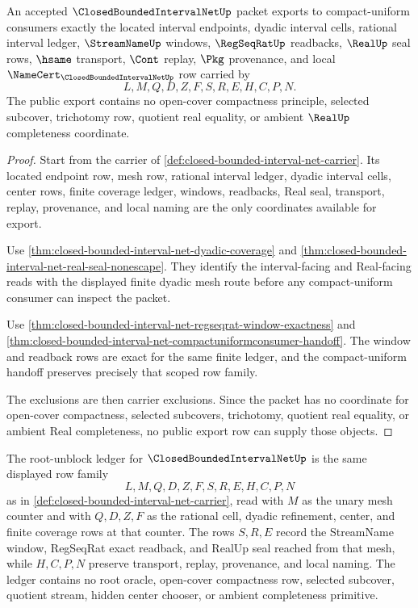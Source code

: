 \begin{theorem}
\label{thm:closed-bounded-interval-net-public-finite-net-export}
An accepted $\ClosedBoundedIntervalNetUp$ packet exports to compact-uniform consumers exactly the located interval endpoints, dyadic interval cells, rational interval ledger, $\StreamNameUp$ windows, $\RegSeqRatUp$ readbacks, $\RealUp$ seal rows, $\hsame$ transport, $\Cont$ replay, $\Pkg$ provenance, and local $\NameCert_{\ClosedBoundedIntervalNetUp}$ row carried by
$$
L,M,Q,D,Z,F,S,R,E,H,C,P,N.
$$
The public export contains no open-cover compactness principle, selected subcover, trichotomy row, quotient real equality, or ambient $\RealUp$ completeness coordinate.
\end{theorem}
\begin{proof}
Start from the carrier of \autoref{def:closed-bounded-interval-net-carrier}. Its located endpoint row, mesh row, rational interval ledger, dyadic interval cells, center rows, finite coverage ledger, windows, readbacks, Real seal, transport, replay, provenance, and local naming are the only coordinates available for export.

Use \autoref{thm:closed-bounded-interval-net-dyadic-coverage} and \autoref{thm:closed-bounded-interval-net-real-seal-nonescape}. They identify the interval-facing and Real-facing reads with the displayed finite dyadic mesh route before any compact-uniform consumer can inspect the packet.

Use \autoref{thm:closed-bounded-interval-net-regseqrat-window-exactness} and \autoref{thm:closed-bounded-interval-net-compactuniformconsumer-handoff}. The window and readback rows are exact for the same finite ledger, and the compact-uniform handoff preserves precisely that scoped row family.

The exclusions are then carrier exclusions. Since the packet has no coordinate for open-cover compactness, selected subcovers, trichotomy, quotient real equality, or ambient Real completeness, no public export row can supply those objects.
\end{proof}

\begin{definition}
\label{def:closed-bounded-interval-net-root-unblock-ledger}
The root-unblock ledger for $\ClosedBoundedIntervalNetUp$ is the same displayed row family
$$
L,M,Q,D,Z,F,S,R,E,H,C,P,N
$$
as in \autoref{def:closed-bounded-interval-net-carrier}, read with $M$ as the unary mesh counter and with $Q,D,Z,F$ as the rational cell, dyadic refinement, center, and finite coverage rows at that counter. The rows $S,R,E$ record the StreamName window, RegSeqRat exact readback, and RealUp seal reached from that mesh, while $H,C,P,N$ preserve transport, replay, provenance, and local naming. The ledger contains no root oracle, open-cover compactness row, selected subcover, quotient stream, hidden center chooser, or ambient completeness primitive.
\end{definition}

